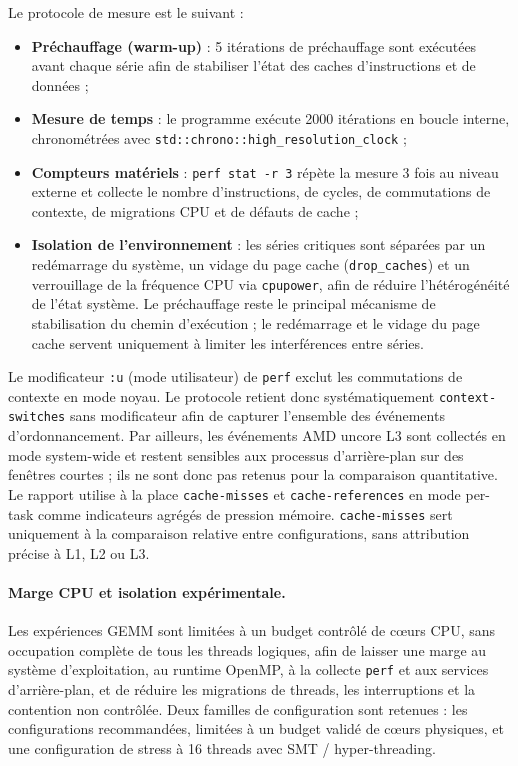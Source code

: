\documentclass[a4paper,11pt,oneside]{article}
\begin{document}
Le protocole de mesure est le suivant :
\begin{itemize}
    \item \textbf{Préchauffage (warm-up)} : 5 itérations de préchauffage sont exécutées avant chaque série afin de stabiliser l'état des caches d'instructions et de données ;
    \item \textbf{Mesure de temps} : le programme exécute 2000 itérations en boucle interne, chronométrées avec \texttt{std::chrono::high\_resolution\_clock} ;
    \item \textbf{Compteurs matériels} : \texttt{perf stat -r 3} répète la mesure 3 fois au niveau externe et collecte le nombre d'instructions, de cycles, de commutations de contexte, de migrations CPU et de défauts de cache ;
    \item \textbf{Isolation de l'environnement} : les séries critiques sont séparées par un redémarrage du système, un vidage du page cache (\texttt{drop\_caches}) et un verrouillage de la fréquence CPU via \texttt{cpupower}, afin de réduire l'hétérogénéité de l'état système.
          Le préchauffage reste le principal mécanisme de stabilisation du chemin d'exécution ; le redémarrage et le vidage du page cache servent uniquement à limiter les interférences entre séries.
\end{itemize}

Le modificateur \texttt{:u} (mode utilisateur) de \texttt{perf} exclut les commutations de contexte en mode noyau.
Le protocole retient donc systématiquement \texttt{context-switches} sans modificateur afin de capturer l'ensemble des événements d'ordonnancement.
Par ailleurs, les événements AMD uncore L3 sont collectés en mode system-wide et restent sensibles aux processus d'arrière-plan sur des fenêtres courtes ; ils ne sont donc pas retenus pour la comparaison quantitative.
Le rapport utilise à la place \texttt{cache-misses} et \texttt{cache-references} en mode per-task comme indicateurs agrégés de pression mémoire.
\texttt{cache-misses} sert uniquement à la comparaison relative entre configurations, sans attribution précise à L1, L2 ou L3.

\paragraph{Marge CPU et isolation expérimentale.}
Les expériences GEMM sont limitées à un budget contrôlé de cœurs CPU, sans occupation complète de tous les threads logiques, afin de laisser une marge au système d'exploitation, au runtime OpenMP, à la collecte \texttt{perf} et aux services d'arrière-plan, et de réduire les migrations de threads, les interruptions et la contention non contrôlée.
Deux familles de configuration sont retenues : les configurations recommandées, limitées à un budget validé de cœurs physiques, et une configuration de stress à 16 threads avec SMT / hyper-threading.
\end{document}
